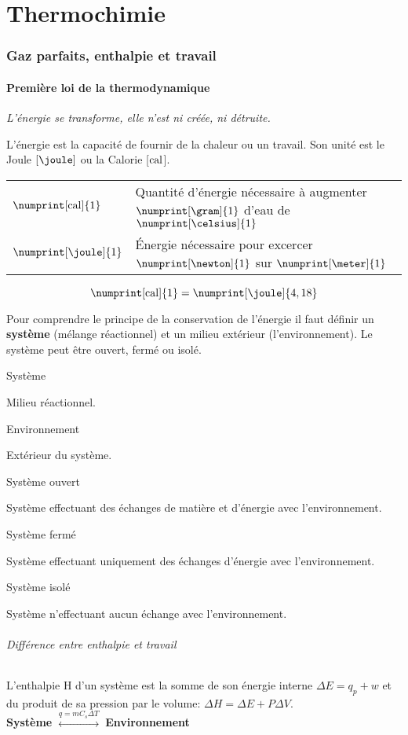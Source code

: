\part{Thermochimie}
\section{Gaz parfaits, enthalpie et travail}
\subsection{Première loi de la thermodynamique}
\emph{L'énergie se transforme, elle n'est ni créée, ni détruite.}

L'énergie est la capacité de fournir de la chaleur ou un travail.
Son unité est le Joule $[\joule]$ ou la Calorie [$\mathrm{cal}$].
\begin{center}
	\begin{tabular}{ll}
		$\numprint[\calo]{1}$ & Quantité  d'énergie nécessaire à augmenter $\numprint[\gram]{1}$ d'eau de $\numprint[\celsius]{1}$\\
		$\numprint[\joule]{1}$ & \'Energie nécessaire pour excercer $\numprint[\newton]{1}$ sur $\numprint[\meter]{1}$
	\end{tabular}
\end{center}
\[ \numprint[\calo]{1} = \numprint[\joule]{4,18} \]

Pour comprendre le principe de la conservation de l'énergie il faut définir un \textbf{système} (mélange réactionnel) et un milieu extérieur (l'environnement).
Le système peut être ouvert, fermé ou isolé.

\subparagraph{Système} Milieu réactionnel.
\subparagraph{Environnement} Extérieur du système.
\subparagraph{Système ouvert} Système effectuant des échanges de matière et d'énergie avec l'environnement.
\subparagraph{Système fermé} Système effectuant uniquement des échanges d'énergie avec l'environnement.
\subparagraph{Système isolé} Système n'effectuant aucun échange avec l'environnement.

\paragraph{Différence entre enthalpie et travail} L'enthalpie H d'un système est la somme de son énergie interne $\Delta E=q_p+w$ et du produit de sa pression par le volume: $\Delta H=\Delta E+P\Delta V$.\\

\textbf{Système} $\stackrel{q=mC_s\Delta T}{\longleftrightarrow}$ \textbf{Environnement}\\

